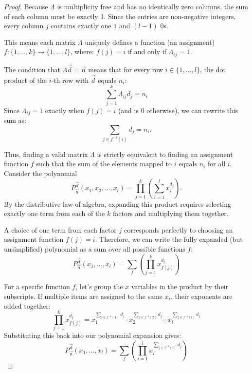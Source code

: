 \documentclass[12pt,a4paper]{amsart}
\theoremstyle{plain}
\theoremstyle{definition}
\theoremstyle{remark}
\numberwithin{equation}{section}
\theoremstyle{ser}
\theoremstyle{serr}
\theoremstyle{ser}
\theoremstyle{ser}
\theoremstyle{collabquestion}
\newcommand{\<}{\langle}
\renewcommand{\>}{\rangle}
\begin{document}
\begin{proof}
    Because $\Lambda$ is multiplicity free and has no identically zero columns, the sum of each column must be exactly 1. Since the entries are non-negative integers, every column $j$ contains exactly one $1$ and $(l-1)$ $0$s.

    This means each matrix $\Lambda$ uniquely defines a function (an assignment) $f: \{1, \dots, k\} \to \{1, \dots, l\}$, where: $f(j) = i$ if and only if $\Lambda_{ij} = 1$.

    The condition that $\Lambda \vec{d} = \vec{n}$ means that for every row $i \in \{1, \dots, l\}$, the dot product of the $i$-th row with $\vec{d}$ equals $n_i$:$$\sum_{j=1}^k \Lambda_{ij} d_j = n_i$$Since $\Lambda_{ij} = 1$ exactly when $f(j) = i$ (and is $0$ otherwise), we can rewrite this sum as:
    \begin{equation}
    \label{eqn:sum_cond}
        \sum_{j \in f^{-1}(i)} d_j = n_i.
    \end{equation}

    Thus, finding a valid matrix $\Lambda$ is strictly equivalent to finding an assignment function $f$ such that the sum of the elements mapped to $i$ equals $n_i$ for all $i$.
    Consider the polynomial $$P_{\vec{n}}^{\vec{d}}(x_1, x_2, \dots, x_l) = \prod_{j=1}^k \left( \sum_{i=1}^l x_i^{d_j} \right).$$
    By the distributive law of algebra, expanding this product requires selecting exactly one term from each of the $k$ factors and multiplying them together.

    A choice of one term from each factor $j$ corresponds perfectly to choosing an assignment function $f(j) = i$. Therefore, we can write the fully expanded (but unsimplified) polynomial as a sum over all possible functions $f$:
    $$P_{\vec{n}}^{\vec{d}}(x_1, \dots, x_l) = \sum_{f} \left( \prod_{j=1}^k x_{f(j)}^{d_j} \right)$$

    For a specific function $f$, let's group the $x$ variables in the product by their subscripts. If multiple items are assigned to the same $x_i$, their exponents are added together:$$\prod_{j=1}^k x_{f(j)}^{d_j} = x_1^{\sum_{j \in f^{-1}(1)} d_j} \cdot x_2^{\sum_{j \in f^{-1}(2)} d_j} \cdots x_l^{\sum_{j \in f^{-1}(l)} d_j}$$Substituting this back into our polynomial expansion gives:
    \begin{equation}
    \label{eqn:poly_sum}
        P_{\vec{n}}^{\vec{d}}(x_1, \dots, x_l) = \sum_{f} \left( \prod_{i=1}^l x_i^{\sum_{j \in f^{-1}(i)} d_j} \right)
    \end{equation}


\end{proof}
\end{document}
